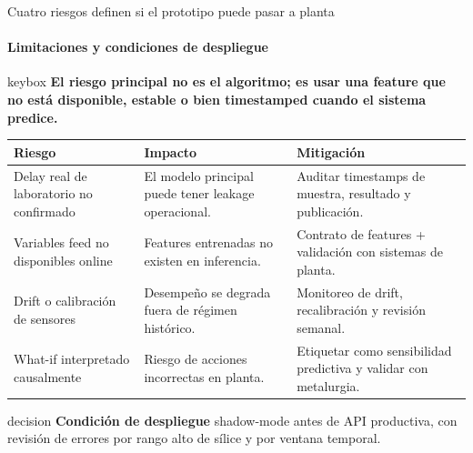 \documentclass[aspectratio=169,10pt]{beamer}
\newcommand{\keymessage}[1]{%
  \vspace{-0.05cm}
  \begin{beamercolorbox}[wd=\textwidth,sep=0.62em,rounded=true]{keybox}
  \textbf{#1}
  \end{beamercolorbox}\vspace{0.10cm}
}
\newcommand{\decisionbox}[2]{%
  \begin{beamercolorbox}[wd=\textwidth,sep=0.65em,rounded=true]{decision}
  \textbf{\textcolor{MinsurBlue}{#1}}\hspace{0.25em} #2
  \end{beamercolorbox}
}
\begin{document}
\begin{frame}{Cuatro riesgos definen si el prototipo puede pasar a planta}
\framesubtitle{Limitaciones y condiciones de despliegue}
\keymessage{El riesgo principal no es el algoritmo; es usar una feature que no está disponible, estable o bien timestamped cuando el sistema predice.}
\small
\begin{tabularx}{\textwidth}{p{}X p{}}
\toprule
\textbf{Riesgo} & \textbf{Impacto} & \textbf{Mitigación}\\
\midrule
Delay real de laboratorio no confirmado & El modelo principal puede tener leakage operacional. & Auditar timestamps de muestra, resultado y publicación.\\
Variables feed no disponibles online & Features entrenadas no existen en inferencia. & Contrato de features + validación con sistemas de planta.\\
Drift o calibración de sensores & Desempeño se degrada fuera de régimen histórico. & Monitoreo de drift, recalibración y revisión semanal.\\
What-if interpretado causalmente & Riesgo de acciones incorrectas en planta. & Etiquetar como sensibilidad predictiva y validar con metalurgia.\\
\bottomrule
\end{tabularx}
\vspace{0.20cm}
\decisionbox{Condición de despliegue}{shadow-mode antes de API productiva, con revisión de errores por rango alto de sílice y por ventana temporal.}
\end{frame}
\end{document}
